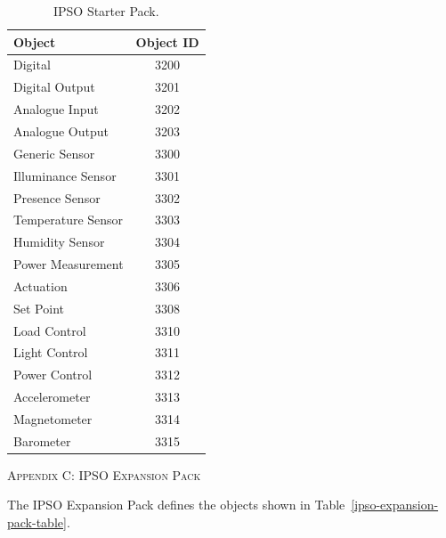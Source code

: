 \documentclass[peerreview, a4paper, 7pt]{IEEEtran}
\begin{document}
\begin{table}[!htbp]
\begin{center}
\caption{IPSO Starter Pack.}
\begin{tabular}{|l|c|}
\hline
\textbf{Object} & \textbf{Object ID}  \\
\hline\hline
Digital	& 3200 \\
\hline
Digital Output	& 3201\\
\hline
Analogue Input	& 3202\\
\hline
Analogue Output & 3203\\
\hline
Generic Sensor	& 3300\\
\hline
Illuminance Sensor & 3301\\
\hline
Presence Sensor	& 3302\\
\hline
Temperature Sensor & 3303\\
\hline
Humidity Sensor	& 3304\\
\hline
Power Measurement & 3305\\
\hline
Actuation & 3306\\
\hline
Set Point & 3308\\
\hline
Load Control & 3310\\
\hline
Light Control & 3311\\
\hline
Power Control & 3312\\
\hline
Accelerometer & 3313\\
\hline
Magnetometer & 3314\\
\hline
Barometer & 3315\\
\hline 
\end{tabular}
\label{ipso-start-pack-table}
\end{center}
\end{table}

\textsc{Appendix C: IPSO Expansion Pack }
\label{appendix_c}

The IPSO Expansion Pack defines the objects shown in Table~\ref{ipso-expansion-pack-table}.
\end{document}
